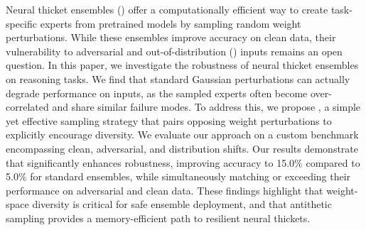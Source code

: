 Neural thicket ensembles (\randopt) offer a computationally efficient way to create task-specific experts from pretrained models by sampling random weight perturbations. While these ensembles improve accuracy on clean data, their vulnerability to adversarial and out-of-distribution (\ood) inputs remains an open question. In this paper, we investigate the robustness of neural thicket ensembles on reasoning tasks. We find that standard Gaussian perturbations can actually degrade performance on \ood inputs, as the sampled experts often become over-correlated and share similar failure modes. To address this, we propose \methodname, a simple yet effective sampling strategy that pairs opposing weight perturbations to explicitly encourage diversity. We evaluate our approach on a custom \rgsm benchmark encompassing clean, adversarial, and \ood distribution shifts. Our results demonstrate that \methodname significantly enhances \ood robustness, improving accuracy to 15.0\% compared to 5.0\% for standard ensembles, while simultaneously matching or exceeding their performance on adversarial and clean data. These findings highlight that weight-space diversity is critical for safe ensemble deployment, and that antithetic sampling provides a memory-efficient path to resilient neural thickets.